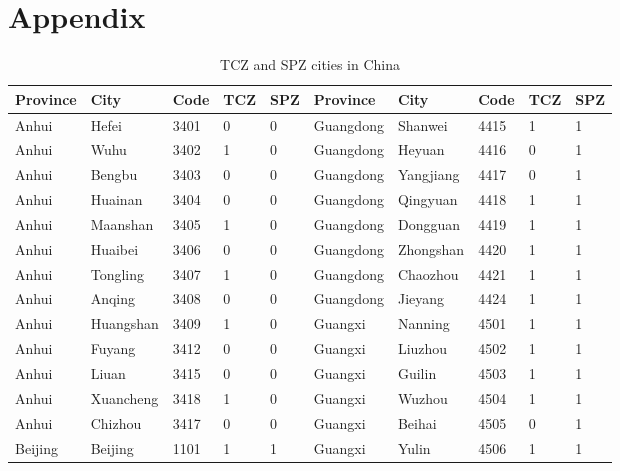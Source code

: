 \section*{Appendix} \label{sec:appendixa}

\begin{table}[!htbp] \centering
  \caption{TCZ and SPZ cities in China}
  \begin{adjustbox}{width=\textwidth, totalheight=\baselineskip,keepaspectratio}
    \label{tab:appendix1}
\begin{tabular}{llllllllll}
\hline
Province  & City      & Code & TCZ & SPZ & Province     & City          & Code & TCZ & SPZ \\
\hline
Anhui     & Hefei     & 3401 & 0   & 0   & Guangdong    & Shanwei       & 4415 & 1   & 1   \\
Anhui     & Wuhu      & 3402 & 1   & 0   & Guangdong    & Heyuan        & 4416 & 0   & 1   \\
Anhui     & Bengbu    & 3403 & 0   & 0   & Guangdong    & Yangjiang     & 4417 & 0   & 1   \\
Anhui     & Huainan   & 3404 & 0   & 0   & Guangdong    & Qingyuan      & 4418 & 1   & 1   \\
Anhui     & Maanshan  & 3405 & 1   & 0   & Guangdong    & Dongguan      & 4419 & 1   & 1   \\
Anhui     & Huaibei   & 3406 & 0   & 0   & Guangdong    & Zhongshan     & 4420 & 1   & 1   \\
Anhui     & Tongling  & 3407 & 1   & 0   & Guangdong    & Chaozhou      & 4421 & 1   & 1   \\
Anhui     & Anqing    & 3408 & 0   & 0   & Guangdong    & Jieyang       & 4424 & 1   & 1   \\
Anhui     & Huangshan & 3409 & 1   & 0   & Guangxi      & Nanning       & 4501 & 1   & 1   \\
Anhui     & Fuyang    & 3412 & 0   & 0   & Guangxi      & Liuzhou       & 4502 & 1   & 1   \\
Anhui     & Liuan     & 3415 & 0   & 0   & Guangxi      & Guilin        & 4503 & 1   & 1   \\
Anhui     & Xuancheng & 3418 & 1   & 0   & Guangxi      & Wuzhou        & 4504 & 1   & 1   \\
Anhui     & Chizhou   & 3417 & 0   & 0   & Guangxi      & Beihai        & 4505 & 0   & 1   \\
Beijing   & Beijing   & 1101 & 1   & 1   & Guangxi      & Yulin         & 4506 & 1   & 1   \\

\end{tabular}
\end{adjustbox}
\end{table}
